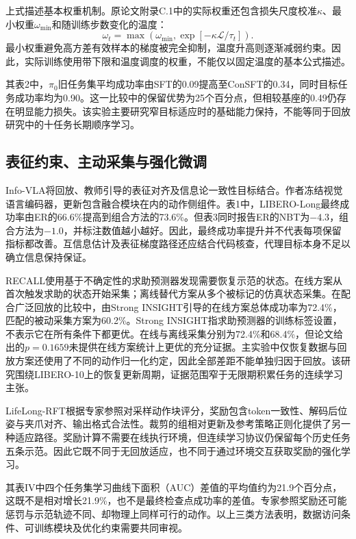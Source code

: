 \documentclass[UTF8,11pt,a4paper,fontset=fandol]{ctexart}
\begin{document}
上式描述基本权重机制。原论文附录C.1中的实际权重还包含损失尺度校准$\kappa$、最小权重$\omega_{\min}$和随训练步数变化的温度：
\begin{equation}
\omega_t=\max\!\left(\omega_{\min},\exp\left[-\kappa\mathcal L/\tau_t\right]\right).
\end{equation}
最小权重避免高方差有效样本的梯度被完全抑制，温度升高则逐渐减弱约束。因此，实际训练使用带下限和温度调度的权重，不能仅以固定温度的基本公式描述。

其表2中，$\pi_0$旧任务集平均成功率由SFT的0.09提高至ConSFT的0.34，同时目标任务成功率均为0.90。这一比较中的保留优势为25个百分点，但相较基座的0.49仍存在明显能力损失。该实验主要研究窄目标适应时的基础能力保持，不能等同于回放研究中的十任务长期顺序学习。

\subsection{表征约束、主动采集与强化微调}
Info-VLA将回放、教师引导的表征对齐及信息论一致性目标结合\cite{info}。作者冻结视觉语言编码器，更新包含融合模块在内的动作侧组件。表1中，LIBERO-Long最终成功率由ER的66.6\%提高到组合方法的73.6\%。但表3同时报告ER的NBT为$-4.3$，组合方法为$-1.0$，并标注数值越小越好。因此，最终成功率提升并不代表每项保留指标都改善。互信息估计及表征梯度路径还应结合代码核查，代理目标本身不足以确立信息保持保证。

RECALL使用基于不确定性的求助预测器发现需要恢复示范的状态\cite{recall}。在线方案从首次触发求助的状态开始采集；离线替代方案从多个被标记的仿真状态采集。在配合广泛回放的比较中，由Strong INSIGHT引导的在线方案总体成功率为72.4\%，匹配的被动采集方案为60.2\%。Strong INSIGHT指求助预测器的训练标签设置，不表示它在所有条件下都更优。在线与离线采集分别为72.4\%和68.4\%，但论文给出的$p=0.1659$未提供在线方案统计上更优的充分证据。主实验中仅恢复数据与回放方案还使用了不同的动作归一化约定，因此全部差距不能单独归因于回放。该研究围绕LIBERO-10上的恢复更新周期，证据范围窄于无限期积累任务的连续学习主张。

LifeLong-RFT根据专家参照对采样动作块评分，奖励包含token一致性、解码后位姿与夹爪对齐、输出格式合法性\cite{lifelong}。裁剪的组相对更新及参考策略正则化提供了另一种适应路径。奖励计算不需要在线执行环境，但连续学习协议仍保留每个历史任务五条示范。因此它既不同于无回放适应，也不同于通过环境交互获取奖励的强化学习。

其表IV中四个任务集学习曲线下面积（AUC）差值的平均值约为21.9个百分点，这既不是相对增长21.9\%，也不是最终检查点成功率的差值。专家参照奖励还可能惩罚与示范轨迹不同、却物理上同样可行的动作。以上三类方法表明，数据访问条件、可训练模块及优化约束需要共同审视。
\end{document}
